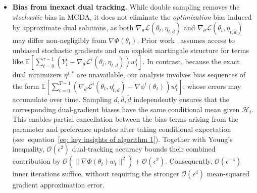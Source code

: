 \documentclass[twoside]{article} %
\def\eqref#1{equation~\ref{#1}}
\theoremstyle{plain}
\theoremstyle{definition}
\theoremstyle{remark}
\newcommand{\fL}{\mathcal{L}}
\newcommand{\calH}{\mathcal{H}}
\begin{document}
\begin{itemize}[leftmargin = *, topsep = 0pt]
\item \textbf{Bias from inexact dual tracking.} While double sampling removes the \emph{stochastic} bias in MGDA, it does not eliminate the \emph{optimization} bias induced by approximate dual solutions, as both \(\nabla_{\theta}\fL(\theta_t,\eta_{t,\bar d})\) and \(\nabla_{\theta}\fL(\theta_t,\eta_{t,\tilde d})\) may differ non-negligibly from \(\nabla\Phi(\theta_t)\). Prior work~\citep{qimgda} assumes access to unbiased stochastic gradients and can exploit martingale structure for terms like $\mathbb{E}[\sum_{t=0}^{\tau-1}(Y_{t}^i-\nabla_{\theta} \fL^i(\theta_t,\eta_{t,d}))w_t^i]$.  In contrast, because the exact dual minimizers $\eta^{i,*}$ are unavailable, our analysis involves bias sequences of the form $\mathbb{E}[\sum_{t=0}^{T-1}(\nabla_{\theta}\fL^i(\theta_t,\eta^i_{t,d})-\nabla\phi^i(\theta_t))w_t^i]$, whose errors may accumulate over time. Sampling \(d,\bar d,\tilde d\) independently  ensures that the corresponding dual-gradient biases have the same conditional mean given \(\calH_t\). This enables partial cancellation between the bias terms arising from the parameter and preference updates after taking conditional expectation (see~\eqref{eq: key insights of algorithm 1}). Together with Young's inequality, \(\mathcal{O}(\epsilon^2)\) dual-tracking accuracy bounds their combined contribution by \(\mathcal{O}(\|\nabla\Phi(\theta_t)w_t\|^2)+\mathcal{O}(\epsilon^2)\). Consequently, \(\mathcal{O}(\epsilon^{-4})\) inner iterations suffice, without requiring the stronger \(\mathcal{O}(\epsilon^4)\) mean-squared gradient approximation error.


\end{itemize}
\end{document}
